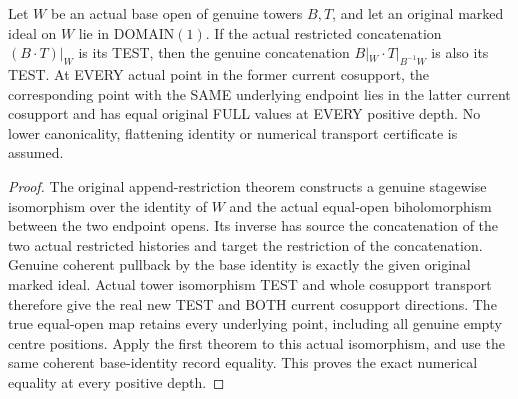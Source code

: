 \begin{theorem}
\label{hir:original-curve-full-restricted-append}
\leanok
Let $W$ be an actual base open of genuine towers $B,T$, and let an
original marked ideal on $W$ lie in DOMAIN$(1)$. If the actual restricted
concatenation $(B\mathbin{\cdot}T)|_W$ is its TEST, then the genuine
concatenation $B|_W\mathbin{\cdot}T|_{B^{-1}W}$ is also its TEST. At
EVERY actual point in the former current cosupport, the corresponding
point with the SAME underlying endpoint lies in the latter current
cosupport and has equal original FULL values at EVERY positive depth.
No lower canonicality, flattening identity or numerical transport
certificate is assumed.
\end{theorem}
\begin{proof}
The original append-restriction theorem constructs a genuine stagewise
isomorphism over the identity of $W$ and the actual equal-open
biholomorphism between the two endpoint opens. Its inverse has source
the concatenation of the two actual restricted histories and target the
restriction of the concatenation. Genuine coherent pullback by the base
identity is exactly the given original marked ideal. Actual tower
isomorphism TEST and whole cosupport transport therefore give the real
new TEST and BOTH current cosupport directions. The true equal-open map
retains every underlying point, including all genuine empty centre
positions. Apply the first theorem to this actual isomorphism, and use
the same coherent base-identity record equality. This proves the exact
numerical equality at every positive depth.
\end{proof}

